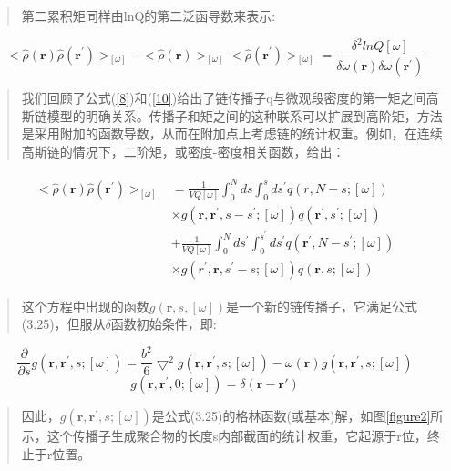 \begin{quotation}
第二累积矩同样由lnQ的第二泛函导数来表示:
\end{quotation}
\begin{equation}\label{27}
<\hat{\rho}(\mathbf{r})\hat{\rho}(\mathbf{r}^{'})>_{[\omega]}-<\hat{\rho}(\mathbf{r})>_{[\omega]}<\hat{\rho}(\mathbf{r}^{'})>_{[\omega]}=\frac{\delta^2 lnQ[\omega]}{\delta\omega(\mathbf{r})\delta \omega(\mathbf{r}^{'})}
\end{equation}
\begin{quotation}
我们回顾了公式(\ref{8})和(\ref{10})给出了链传播子q与微观段密度的第一矩之间高斯链模型的明确关系。传播子和矩之间的这种联系可以扩展到高阶矩，方法是采用附加的函数导数，从而在附加点上考虑链的统计权重。例如，在连续高斯链的情况下，二阶矩，或密度-密度相关函数，给出：
\end{quotation}
\begin{align}\label{28}
\begin{split}
<\hat{\rho}(\mathbf{r})\hat{\rho}(\mathbf{r}^{'})>_{[\omega]}&=\frac{1}{VQ[\omega]}\int_{0}^{N}ds \int_{0}^{s}ds^{'}q(r,N-s;[\omega])\\&\times g(\mathbf{r},\mathbf{r}^{'},s-s^{'};[\omega])q(\mathbf{r}^{'},s^{'};[\omega])\\&+\frac{1}{VQ[\omega]}\int_{0}^{N}ds^{'} \int_{0}^{s^{'}}ds^{'}q(\mathbf{r}^{'},N-s^{'};[\omega])\\&\times g(r^{'},\mathbf{r},s^{'}-s;[\omega])q(\mathbf{r},s;[\omega])
\end{split}
\end{align}
\begin{quotation}
这个方程中出现的函数$g(\mathbf{r},s,[\omega])$是一个新的链传播子，它满足公式(3.25)，但服从$\delta$函数初始条件，即:
\end{quotation}
\begin{equation}\label{29}
\frac{\partial}{\partial s}g(\mathbf{r},\mathbf{r}^{'},s;[\omega])=\frac{b^2}{6}\bigtriangledown^2g(\mathbf{r},\mathbf{r}^{'},s;[\omega])-\omega(\mathbf{r})g(\mathbf{r},\mathbf{r}^{'},s;[\omega])
\end{equation}
\begin{equation}\label{30}
g(\mathbf{r},\mathbf{r}^{'},0;[\omega])=\delta(\mathbf{r}-\mathbf{r}{'})
\end{equation}
\begin{quotation}
因此，$g(\mathbf{r},\mathbf{r}^{'},s;[\omega])$是公式(3.25)的格林函数(或基本)解，如图\ref{figure2}所示，这个传播子生成聚合物的长度s内部截面的统计权重，它起源于r位，终止于r位置。
\end{quotation}
